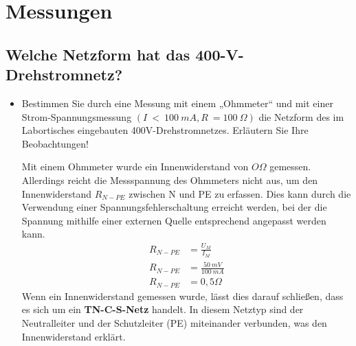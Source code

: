 \section{Messungen}

	\subsection{Welche Netzform hat das 400-V-Drehstromnetz?}
		\begin{itemize}
			\item Bestimmen Sie durch eine Messung mit einem „Ohmmeter“ und mit einer Strom-Spannungsmessung  $(I\ <\ 100\ mA, R\ = 100\ \Omega)$ die Netzform des im Labortisches eingebauten 400V-Drehstromnetzes. Erläutern Sie Ihre Beobachtungen! 
			
			Mit einem Ohmmeter wurde ein Innenwiderstand von $O \Omega$ gemessen. Allerdings reicht die Messspannung des Ohmmeters nicht aus, um den Innenwiderstand $R_{N-PE}$ zwischen N und PE zu erfassen. Dies kann durch die Verwendung einer Spannungsfehlerschaltung erreicht werden, bei der die Spannung mithilfe einer externen Quelle entsprechend angepasst werden kann.
			\newline
			\begin{align*}
				R_{N-PE} &= \frac{U_{M}}{I_{M}}\\
				R_{N-PE} &= \frac{50\ mV}{100\ mA}\\
				R_{N-PE} &= 0,5 \Omega
			\end{align*}
			Wenn ein Innenwiderstand gemessen wurde, lässt dies darauf schließen, dass es sich um ein \textbf{TN-C-S-Netz} handelt. In diesem Netztyp sind der Neutralleiter und der Schutzleiter (PE) miteinander verbunden, was den Innenwiderstand erklärt.
		\end{itemize}
		
		
